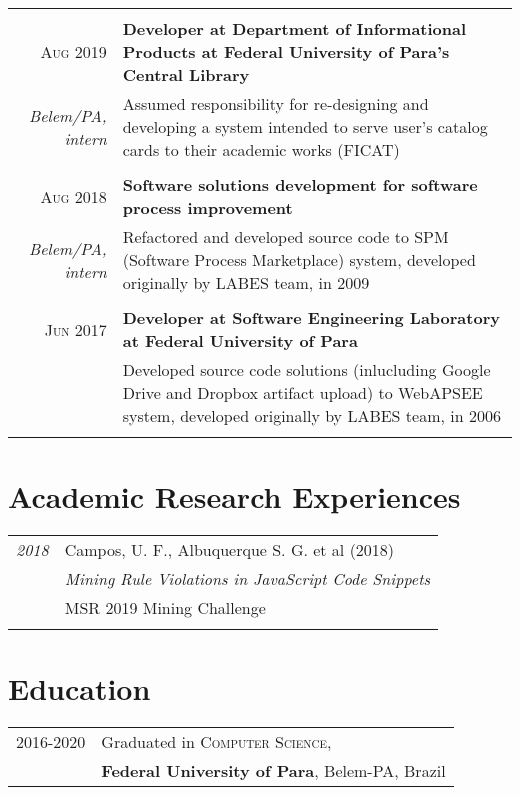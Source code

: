 \documentclass[a4paper,10pt]{article}
\begin{document}
\begin{tabular}{r|p{11cm}}
\begin{itemize}
  \end{itemize}\\
\textsc{Aug 2019} & \textbf{Developer at Department of Informational Products at Federal University of Para's Central Library}\\
\footnotesize{\textit{Belem/PA, intern}}
  & \footnotesize{Assumed responsibility for re-designing and developing a system intended to serve user's catalog cards to their academic works (FICAT)}\\\\
\textsc{Aug 2018}& \textbf{Software solutions development for software process improvement}\\
\footnotesize{\textit{Belem/PA, intern}}
  & \footnotesize{Refactored and developed source code to SPM (Software Process Marketplace) system, developed originally by LABES team, in 2009}\\\\
\textsc{Jun 2017} & \textbf{Developer at Software Engineering Laboratory at Federal University of Para}\\
  &\footnotesize{Developed source code solutions (inlucluding Google Drive and Dropbox artifact upload) to WebAPSEE system, developed originally by LABES team, in 2006}\\
\multicolumn{2}{c}{}\\
\end{tabular}

\section{Academic Research Experiences}
\begin{tabular}{r|p{11cm}}
 \emph{2018} & Campos, U. F., Albuquerque S. G. et al (2018)\\
 & \textit{Mining Rule Violations in JavaScript Code Snippets}\\
 & MSR 2019 Mining Challenge\\\multicolumn{2}{c}{} \\
\end{tabular}

\section{Education}
\begin{tabular}{rl}	
2016-2020 & Graduated in \textsc{Computer Science}, \\
& \textbf{Federal University of Para}, Belem-PA, Brazil
\end{tabular}
\end{document}
